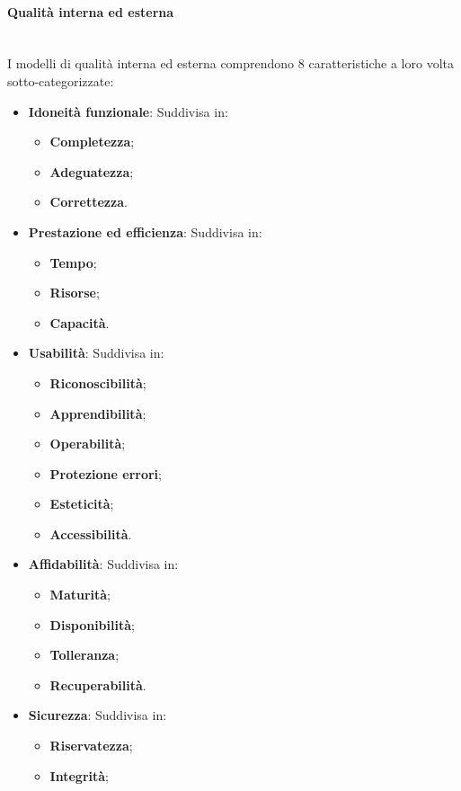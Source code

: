 \paragraph {Qualità interna ed esterna}\mbox{}\\
I modelli di qualità interna ed esterna comprendono 8 caratteristiche a loro volta sotto-categorizzate:
\begin{itemize}
	\item \textbf{Idoneità funzionale}: Suddivisa in:
	\begin{itemize}
		\item \textbf{Completezza};
		\item \textbf{Adeguatezza};
		\item \textbf{Correttezza}.
	\end{itemize}
	\item \textbf{Prestazione ed efficienza}: Suddivisa in:
	\begin{itemize}
		\item \textbf{Tempo};
		\item \textbf{Risorse};
		\item \textbf{Capacità}.
	\end{itemize}
	\item \textbf{Usabilità}: Suddivisa in:
	\begin{itemize}
		\item \textbf{Riconoscibilità};
		\item \textbf{Apprendibilità};
		\item \textbf{Operabilità};
		\item \textbf{Protezione errori};
		\item \textbf{Esteticità};
		\item \textbf{Accessibilità}.
	\end{itemize}
	\item \textbf{Affidabilità}: Suddivisa in:
	\begin{itemize}
		\item \textbf{Maturità};
		\item \textbf{Disponibilità};
		\item \textbf{Tolleranza};
		\item \textbf{Recuperabilità}.
	\end{itemize}
	\item \textbf{Sicurezza}: Suddivisa in:
	\begin{itemize}
		\item \textbf{Riservatezza};
		\item \textbf{Integrità};

\end{itemize}
\end{itemize}
